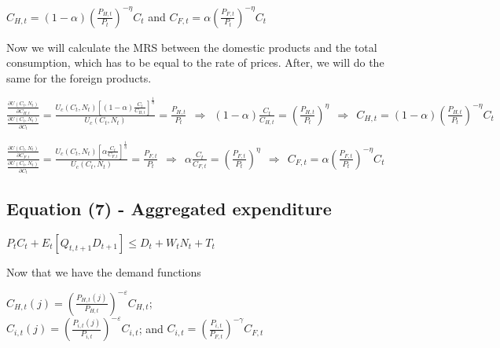 \documentclass[
]{article}
\begin{document}
\(C_{H,t} = (1-\alpha)\left( \frac{P_{H,t}}{P_t} \right)^{-\eta}C_t\)
and \(C_{F,t} = \alpha \left( \frac{P_{F,t}}{P_t} \right)^{-\eta}C_t\)

\vspace{8pt}

Now we will calculate the MRS between the domestic products and the
total consumption, which has to be equal to the rate of prices. After,
we will do the same for the foreign products.

\(\displaystyle \frac{\displaystyle \frac{\partial U(C_t,N_t)}{\displaystyle \partial C_{H,t}}}{\frac{\displaystyle \partial U(C_t,N_t)}{\displaystyle \partial C_t}} = \frac{\displaystyle U_c(C_t,N_t) \left[ (1-\alpha) \frac{C_t}{C_{H,t}} \right]^{\frac{1}{\eta}}}{\displaystyle U_c(C_t,N_t) } = \frac{P_{H,t}}{P_t} \ \ \Rightarrow \ \ (1-\alpha) \frac{C_t}{C_{H,t}} = \left( \frac{P_{H,t}}{P_t} \right)^\eta \ \ \Rightarrow \ \ C_{H,t} = (1-\alpha)\left( \frac{P_{H,t}}{P_t} \right)^{-\eta}C_t\)

\(\displaystyle \frac{\displaystyle \frac{\partial U(C_t,N_t)}{\displaystyle \partial C_{F,t}}}{\frac{\displaystyle \partial U(C_t,N_t)}{\displaystyle \partial C_t}} = \frac{\displaystyle U_c(C_t,N_t) \left[ \alpha \frac{C_t}{C_{F,t}} \right]^{\frac{1}{\eta}}}{\displaystyle U_c(C_t,N_t) } = \frac{P_{F,t}}{P_t} \ \ \Rightarrow \ \ \alpha \frac{C_t}{C_{F,t}} = \left( \frac{P_{F,t}}{P_t} \right)^\eta \ \ \Rightarrow \ \ C_{F,t} = \alpha \left( \frac{P_{F,t}}{P_t} \right)^{-\eta}C_t\)

\vspace{12pt}

\hypertarget{equation-7---aggregated-expenditure}{%
\subsection{Equation (7) - Aggregated
expenditure}\label{equation-7---aggregated-expenditure}}

\(\displaystyle P_t C_t + E_t[ Q_{t,t+1}D_{t+1}] \leq D_t + W_tN_t + T_t\)

\vspace{8pt}

Now that we have the demand functions

\(\displaystyle C_{H,t}(j)= \left( \frac{P_{H,t}(j)}{P_{H,t}}\right)^{-\varepsilon}C_{H,t}\);\\
\(\displaystyle C_{i,t}(j)= \left( \frac{P_{i,t}(j)}{P_{i,t}}\right)^{-\varepsilon}C_{i,t}\);
and
\(\displaystyle C_{i,t}= \left( \frac{P_{i,t}}{P_{F,t}}\right)^{-\gamma}C_{F,t}\)
\end{document}
